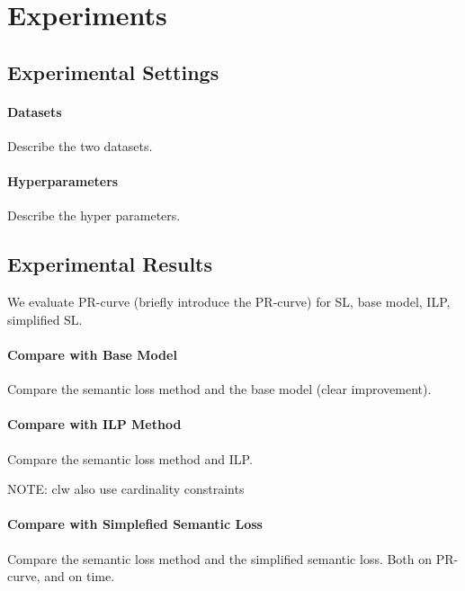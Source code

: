 \section{Experiments}

\subsection{Experimental Settings}
\paragraph{Datasets}
Describe the two datasets.

\paragraph{Hyperparameters}
Describe the hyper parameters.

\subsection{Experimental Results}
We evaluate PR-curve (briefly introduce the PR-curve) for SL, base model, ILP, simplified SL.
\paragraph{Compare with Base Model}
Compare the semantic loss method and the base model (clear improvement).

\paragraph{Compare with ILP Method}
Compare the semantic loss method and ILP.

NOTE: clw also use cardinality constraints

\paragraph{Compare with Simplefied Semantic Loss}
Compare the semantic loss method and the simplified semantic loss.
Both on PR-curve, and on time.




